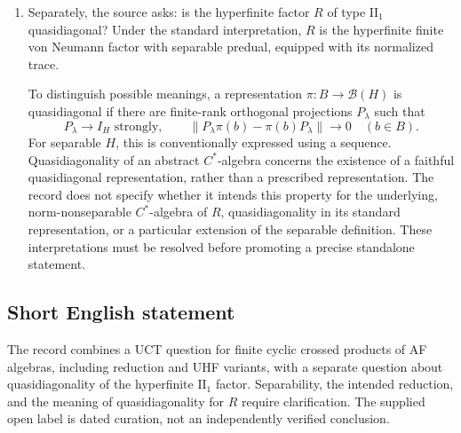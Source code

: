 \documentclass[11pt]{article}
\begin{document}
\begin{enumerate}
With the separable convention explicitly imposed, the inheritance question is whether
\[
\forall A\text{ separable AF},\quad
\forall n\geq1,\quad
\forall\alpha\colon\mathbb Z_n\to\operatorname{Aut}(A),\qquad
A\rtimes_\alpha\mathbb Z_n\text{ satisfies the UCT}.
\]
The source also asks whether the general UCT problem can be reduced to these crossed products, and whether the answers change upon restricting \(A\) to UHF algebras. Under the customary meaning of the general UCT problem, one possible precise reduction target is the implication
\[
\begin{gathered}
\text{Every finite cyclic crossed product of a separable AF algebra satisfies the UCT}\\
\Longrightarrow\\
\text{Every separable nuclear \(C^*\)-algebra satisfies the UCT}.
\end{gathered}
\]
This implication is an interpretation of the requested reduction, not an assertion that it holds. The supplied record does not specify the intended reduction or whether its UHF question concerns inheritance, reduction, or both. Without resolving the separability convention, the displayed inheritance statement is only a conditional formulation of the source question.

\item Separately, the source asks: is the hyperfinite factor \(R\) of type \(\mathrm{II}_1\) quasidiagonal? Under the standard interpretation, \(R\) is the hyperfinite finite von Neumann factor with separable predual, equipped with its normalized trace.

To distinguish possible meanings, a representation \(\pi\colon B\to\mathcal B(H)\) is quasidiagonal if there are finite-rank orthogonal projections \(P_\lambda\) such that
\[
P_\lambda\longrightarrow I_H\text{ strongly},\qquad
\|P_\lambda\pi(b)-\pi(b)P_\lambda\|\longrightarrow0
\quad(b\in B).
\]
For separable \(H\), this is conventionally expressed using a sequence. Quasidiagonality of an abstract \(C^*\)-algebra concerns the existence of a faithful quasidiagonal representation, rather than a prescribed representation. The record does not specify whether it intends this property for the underlying, norm-nonseparable \(C^*\)-algebra of \(R\), quasidiagonality in its standard representation, or a particular extension of the separable definition. These interpretations must be resolved before promoting a precise standalone statement.
\end{enumerate}
\subsection{Short English statement}
The record combines a UCT question for finite cyclic crossed products of AF algebras, including reduction and UHF variants, with a separate question about quasidiagonality of the hyperfinite \(\mathrm{II}_1\) factor. Separability, the intended reduction, and the meaning of quasidiagonality for \(R\) require clarification. The supplied open label is dated curation, not an independently verified conclusion.
\end{document}
